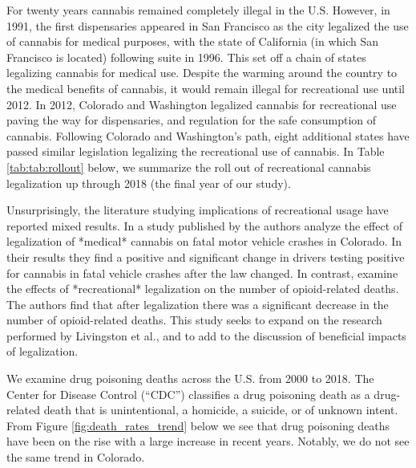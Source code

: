 \documentclass{article}
\begin{document}
For twenty years cannabis remained completely illegal in the U.S. However, in 1991, the first dispensaries appeared in San Francisco as the city legalized the use of cannabis for medical purposes, with the state of California (in which San Francisco is located) following suite in 1996. This set off a chain of states legalizing cannabis for medical use. Despite the warming around the country to the medical benefits of cannabis, it would remain illegal for recreational use until 2012. In 2012, Colorado and Washington legalized cannabis for recreational use paving the way for dispensaries, and regulation for the safe consumption of cannabis. Following Colorado and Washington's path, eight additional states have passed similar legislation legalizing the recreational use of cannabis. In Table \ref{tab:tab:rollout} below, we summarize the roll out of recreational cannabis legalization up through 2018 (the final year of our study).



Unsurprisingly, the literature studying implications of recreational usage have reported mixed results. In a study published by \citet{Salomonsen-SautelStacy2014Tifm} the authors analyze the effect of legalization of *medical* cannabis on fatal motor vehicle crashes in Colorado. In their results they find a positive and significant change in drivers testing positive for cannabis in fatal vehicle crashes after the law changed. In contrast, \citet{LivingstonMelvinD2017RCLa} examine the effects of *recreational* legalization on the number of opioid-related deaths. The authors find that after legalization there was a significant decrease in the number of opioid-related deaths. This study seeks to expand on the research performed by Livingston et al., and to add to the discussion of beneficial impacts of legalization.

We examine drug poisoning deaths across the U.S. from 2000 to 2018. The Center for Disease Control (``CDC'') classifies a drug poisoning death as a drug-related death that is unintentional, a homicide, a suicide, or of unknown intent. From Figure \ref{fig:death_rates_trend} below we see that drug poisoning deaths have been on the rise with a large increase in recent years. Notably, we do not see the same trend in Colorado.
\end{document}
